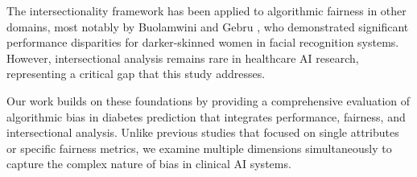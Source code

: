 The intersectionality framework has been applied to algorithmic fairness 
in other domains, most notably by Buolamwini and Gebru \cite{buolamwini2018}, 
who demonstrated significant performance disparities for darker-skinned 
women in facial recognition systems. However, intersectional analysis 
remains rare in healthcare AI research, representing a critical gap that 
this study addresses.

Our work builds on these foundations by providing a comprehensive evaluation 
of algorithmic bias in diabetes prediction that integrates performance, 
fairness, and intersectional analysis. Unlike previous studies that focused 
on single attributes or specific fairness metrics, we examine multiple 
dimensions simultaneously to capture the complex nature of bias in clinical 
AI systems.
